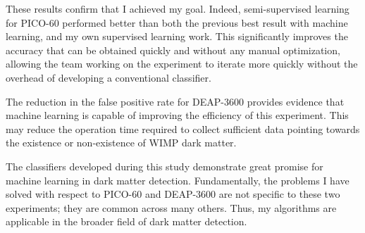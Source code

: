 \documentclass[12pt]{article}
\begin{document}
These results confirm that I achieved my goal. Indeed, semi-supervised learning for PICO-60 performed better than both the previous best result with machine learning, and my own supervised learning work. This significantly improves the accuracy that can be obtained quickly and without any manual optimization, allowing the team working on the experiment to iterate more quickly without the overhead of developing a conventional classifier.

The reduction in the false positive rate for DEAP-3600 provides evidence that machine learning is capable of improving the efficiency of this experiment. This may reduce the operation time required to collect sufficient data pointing towards the existence or non-existence of WIMP dark matter.

The classifiers developed during this study demonstrate great promise for machine learning in dark matter detection. Fundamentally, the problems I have solved with respect to PICO-60 and DEAP-3600 are not specific to these two experiments; they are common across many others. Thus, my algorithms are applicable in the broader field of dark matter detection.

\singlespacing
\printbibliography
\end{document}
